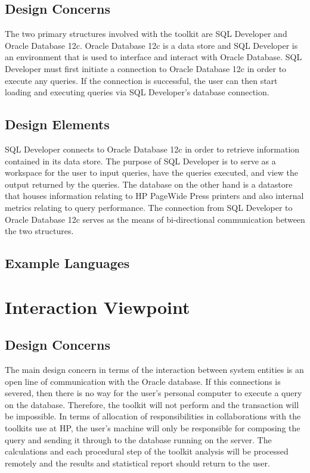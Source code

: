 \documentclass[draftclsnofoot, onecolumn, compsoc, 10pt]{IEEEtran}
\begin{document}
\subsection{Design Concerns}
The two primary structures involved with the toolkit are SQL Developer and Oracle Database 12c.
Oracle Database 12c is a data store and SQL Developer is an environment that is used to interface and interact with Oracle Database.
SQL Developer must first initiate a connection to Oracle Database 12c in order to execute any queries.
If the connection is successful, the user can then start loading and executing queries via SQL Developer’s database connection.
\subsection{Design Elements}
SQL Developer connects to Oracle Database 12c in order to retrieve information contained in its data store.
The purpose of SQL Developer is to serve as a workspace for the user to input queries, have the queries executed, and view the output returned by the queries.
The database on the other hand is a datastore that houses information relating to HP PageWide Press printers and also internal metrics relating to query performance.
The connection from SQL Developer to Oracle Database 12c serves as the means of bi-directional communication between the two structures.
\subsection{Example Languages}


\section{Interaction Viewpoint}

\subsection{Design Concerns}
The main design concern in terms of the interaction between system entities is an open line of communication with the Oracle database.
If this connections is severed, then there is no way for the user’s personal computer to execute a query on the database.
Therefore, the toolkit will not perform and the transaction will be impossible. 
In terms of allocation of responsibilities in collaborations with the toolkits use at HP, the user's machine will only be responsible for composing the query and sending it through to the database running on the server.
The calculations and each procedural step of the toolkit analysis will be processed remotely and the results and statistical report should return to the user.
\end{document}
